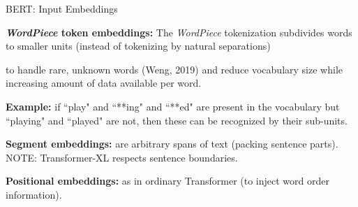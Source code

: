 \begin{frame}{BERT: Input Embeddings}
    \normalsize \linespread{0.5}
    
    \begin{enumerateSpaced}{15pt}
        \item \textbf{\textit{WordPiece} token embeddings: }The \emph{WordPiece} tokenization subdivides words to smaller units (instead of tokenizing by natural separations)
        
        \begin{itemizeSpaced}{15pt}
            \normalsize \linespread{0.5}
        
            \item to handle rare, unknown words (Weng, 2019) and reduce vocabulary size while increasing amount of data available per word.
            
            \item \textbf{Example: }if ``play" and ``**ing" and ``**ed" are present in the vocabulary but ``playing" and ``played" are not, then these can be recognized by their sub-units. 
        \end{itemizeSpaced}
        
        
        \item \textbf{Segment embeddings: } are arbitrary spans of text (packing sentence parts). 
        NOTE: Transformer-XL respects sentence boundaries. 
        
        \item \textbf{Positional embeddings: } as in ordinary Transformer (to inject word order information). 
    
    \end{enumerateSpaced}
    
\end{frame}





